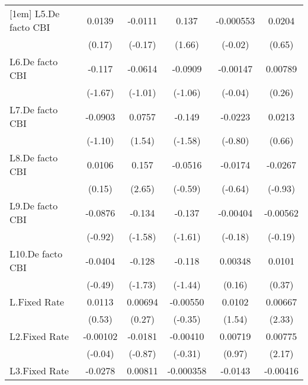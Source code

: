 {\begin{longtable}{l*{5}{c}}
[1em]
L5.De facto CBI &   0.0139         &  -0.0111         &    0.137         &-0.000553         &   0.0204         \\
                &   (0.17)         &  (-0.17)         &   (1.66)         &  (-0.02)         &   (0.65)         \\
[1em]
L6.De facto CBI &   -0.117         &  -0.0614         &  -0.0909         & -0.00147         &  0.00789         \\
                &  (-1.67)         &  (-1.01)         &  (-1.06)         &  (-0.04)         &   (0.26)         \\
[1em]
L7.De facto CBI &  -0.0903         &   0.0757         &   -0.149         &  -0.0223         &   0.0213         \\
                &  (-1.10)         &   (1.54)         &  (-1.58)         &  (-0.80)         &   (0.66)         \\
[1em]
L8.De facto CBI &   0.0106         &    0.157\sym{**} &  -0.0516         &  -0.0174         &  -0.0267         \\
                &   (0.15)         &   (2.65)         &  (-0.59)         &  (-0.64)         &  (-0.93)         \\
[1em]
L9.De facto CBI &  -0.0876         &   -0.134         &   -0.137         & -0.00404         & -0.00562         \\
                &  (-0.92)         &  (-1.58)         &  (-1.61)         &  (-0.18)         &  (-0.19)         \\
[1em]
L10.De facto CBI&  -0.0404         &   -0.128         &   -0.118         &  0.00348         &   0.0101         \\
                &  (-0.49)         &  (-1.73)         &  (-1.44)         &   (0.16)         &   (0.37)         \\
[1em]
L.Fixed Rate    &   0.0113         &  0.00694         & -0.00550         &   0.0102         &  0.00667\sym{*}  \\
                &   (0.53)         &   (0.27)         &  (-0.35)         &   (1.54)         &   (2.33)         \\
[1em]
L2.Fixed Rate   & -0.00102         &  -0.0181         & -0.00410         &  0.00719         &  0.00775\sym{*}  \\
                &  (-0.04)         &  (-0.87)         &  (-0.31)         &   (0.97)         &   (2.17)         \\
[1em]
L3.Fixed Rate   &  -0.0278         &  0.00811         &-0.000358         &  -0.0143         & -0.00416         \\

\end{longtable}}
